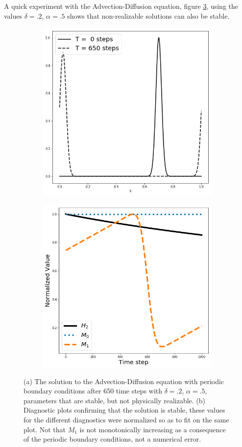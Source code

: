 \documentclass[]{article}
\begin{document}
A quick experiment with the Advection-Diffusion equation, figure \ref{fig:fig}, using the values $\delta = .2$, $\alpha = .5$ shows that non-realizable solutions can also be stable. 

\begin{figure}
	\begin{subfigure}{.5\textwidth}
		\centering
		\includegraphics[width=.8\linewidth]{figures/stable_not_realizable.png}
		\caption{}
		\label{fig:sfig1}
	\end{subfigure}%
	\begin{subfigure}{.5\textwidth}
		\centering
		\includegraphics[width=.8\linewidth]{figures/stable_not_real_diagnostic.png}
		\caption{}
		\label{fig:sfig2}
	\end{subfigure}
	\caption{(a) The solution to the Advection-Diffusion equation with periodic boundary conditions after 650 time steps with $\delta = .2$, $\alpha = .5$, parameters that are stable, but not physically realizable. (b) Diagnostic plots confirming that the solution is stable, these values for the different diagnostics were normalized so as to fit on the same plot. Not that $M_1$ is not monotonically increasing as a consequence of the periodic boundary conditions, not a numerical error.}
	\label{fig:fig}
\end{figure}
\end{document}
